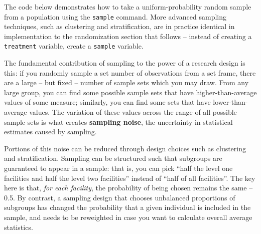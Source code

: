 The code below demonstrates how to take
a uniform-probability random sample
from a population using the \texttt{sample} command.
More advanced sampling techniques,
such as clustering and stratification,
are in practice identical in implementation
to the randomization section that follows --
instead of creating a \texttt{treatment} variable,
create a \texttt{sample} variable.

{
}

The fundamental contribution of sampling to the power of a research design is this:
if you randomly sample a set number of observations from a set frame,
there are a large -- but fixed -- number of sample sets which you may draw.
From any large group, you can find some possible sample sets
that have higher-than-average values of some measure;
similarly, you can find some sets that have lower-than-average values.
The variation of these values across the range of all possible sample sets is what creates
\textbf{sampling noise}, the uncertainty in statistical estimates caused by sampling.

Portions of this noise can be reduced through design choices
such as clustering and stratification.
Sampling can be structured such that subgroups are guaranteed to appear in a sample:
that is, you can pick ``half the level one facilities and half the level two facilities'' instead of
``half of all facilities''. The key here is that, \textit{for each facility},
the probability of being chosen remains the same -- 0.5.
By contrast, a sampling design that chooses unbalanced proportions of subgroups
has changed the probability that a given individual is included in the sample,
and needs to be reweighted in case you want to calculate overall average statistics.


